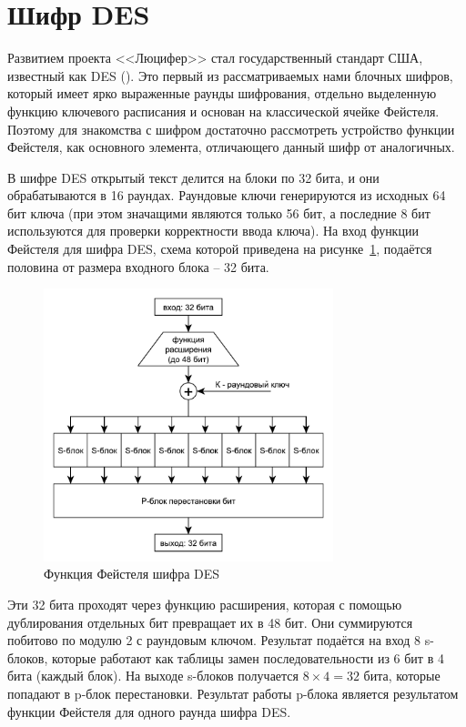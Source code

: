 \section{Шифр DES}

Развитием проекта <<Люцифер>> стал государственный стандарт США, известный как DES (). Это первый из рассматриваемых нами блочных шифров, который имеет ярко выраженные раунды шифрования, отдельно выделенную функцию ключевого расписания и основан на классической ячейке Фейстеля. Поэтому для знакомства с шифром достаточно рассмотреть устройство функции Фейстеля, как основного элемента, отличающего данный шифр от аналогичных.

В шифре DES открытый текст делится на блоки по 32 бита, и они обрабатываются в 16 раундах. Раундовые ключи генерируются из исходных 64 бит ключа (при этом значащими являются только 56 бит, а последние 8 бит используются для проверки корректности ввода ключа). На вход функции Фейстеля для шифра DES, схема которой приведена на рисунке~\ref{fig:des}, подаётся половина от размера входного блока -- 32 бита.

\begin{figure}[!htb]
    \centering
    \includegraphics[width=0.75\textwidth]{pic/des}
    \caption{Функция Фейстеля шифра DES\label{fig:des}}
\end{figure}

Эти 32 бита проходят через функцию расширения, которая с помощью дублирования отдельных бит превращает их в 48 бит. Они суммируются побитово по модулю 2 с раундовым ключом. Результат подаётся на вход 8 s-блоков, которые работают как таблицы замен последовательности из 6 бит в 4 бита (каждый блок). На выходе s-блоков получается $8 \times 4 = 32$ бита, которые попадают в p-блок перестановки. Результат работы p-блока является результатом функции Фейстеля для одного раунда шифра DES.

